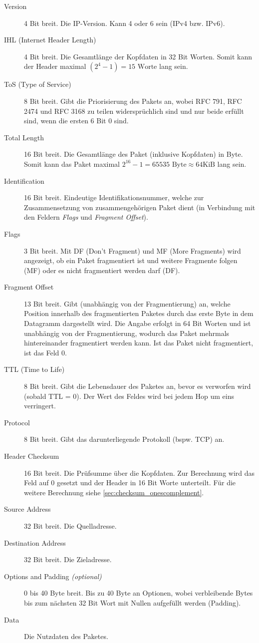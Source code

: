 \documentclass[a4paper, 11pt, accentcolor = tud3b]{tudreport}
\begin{document}
	        \begin{description}
	        	\item[Version] 4 Bit breit. Die IP-Version. Kann 4 oder 6 sein (IPv4 bzw. IPv6).
	        	\item[IHL (Internet Header Length)] 4 Bit breit. Die Gesamtlänge der Kopfdaten in 32 Bit Worten. Somit kann der Header maximal $ (2 ^ 4 - 1) = 15\text{ Worte} $ lang sein.
	        	\item[ToS (Type of Service)] 8 Bit breit. Gibt die Priorisierung des Pakets an, wobei RFC 791, RFC 2474 und RFC 3168 zu teilen widersprüchlich sind und nur beide erfüllt sind, wenn die ersten 6 Bit 0 sind.
	        	\item[Total Length] 16 Bit breit. Die Gesamtlänge des Paket (inklusive Kopfdaten) in Byte. Somit kann das Paket maximal $ 2 ^ 16 - 1 = 65535\text{ Byte} \approx 64\text{KiB} $ lang sein.
	        	\item[Identification] 16 Bit breit. Eindeutige Identifikationsnummer, welche zur Zusammensetzung von zusammengehörigen Paket dient (in Verbindung mit den Feldern \textit{Flags} und \textit{Fragment Offset}).
	        	\item[Flags] 3 Bit breit. Mit DF (Don't Fragment) und MF (More Fragments) wird angezeigt, ob ein Paket fragmentiert ist und weitere Fragmente folgen (MF) oder es nicht fragmentiert werden darf (DF).
	        	\item[Fragment Offset] 13 Bit breit. Gibt (unabhängig von der Fragmentierung) an, welche Position innerhalb des fragmentierten Paketes durch das erste Byte in dem Datagramm dargestellt wird. Die Angabe erfolgt in 64 Bit Worten und ist unabhängig von der Fragmentierung, wodurch das Paket mehrmals hintereinander fragmentiert werden kann. Ist das Paket nicht fragmentiert, ist das Feld 0.
	        	\item[TTL (Time to Life)] 8 Bit breit. Gibt die Lebensdauer des Paketes an, bevor es verworfen wird (sobald TTL = 0). Der Wert des Feldes wird bei jedem Hop um eins verringert.
	        	\item[Protocol] 8 Bit breit. Gibt das darunterliegende Protokoll (bspw. TCP) an.
	        	\item[Header Checksum] 16 Bit breit. Die Prüfsumme über die Kopfdaten. Zur Berechnung wird das Feld auf 0 gesetzt und der Header in 16 Bit Worte unterteilt. Für die weitere Berechnung siehe \ref{sec:checksum_onescomplement}.
	        	\item[Source Address] 32 Bit breit. Die Quelladresse.
	        	\item[Destination Address] 32 Bit breit. Die Zieladresse.
	        	\item[Options and Padding \textit{(optional)}] 0 bis 40 Byte breit. Bis zu 40 Byte an Optionen, wobei verbleibende Bytes bis zum nächsten 32 Bit Wort mit Nullen aufgefüllt werden (Padding).
	        	\item[Data] Die Nutzdaten des Paketes.
	        \end{description}
\end{document}
